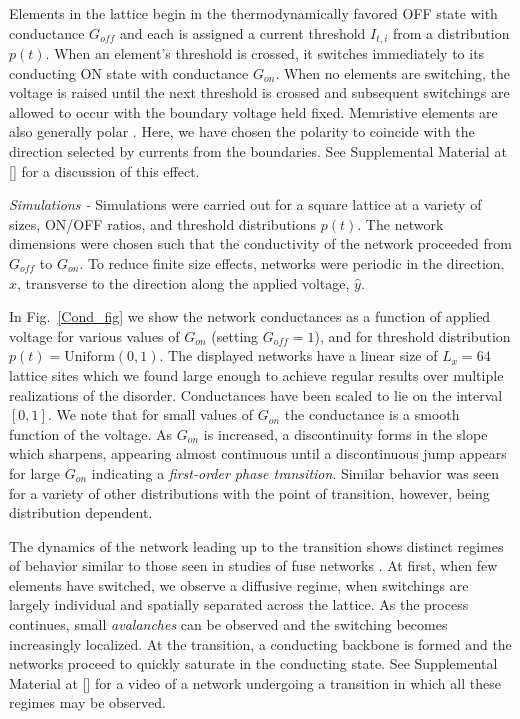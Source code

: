 \documentclass[aps,prl,reprint,groupedaddress]{revtex4-1}
\begin{document}

Elements in the lattice begin in the thermodynamically favored OFF state with conductance
$G_{off}$ and each is assigned a current threshold $I_{t,i}$ from a distribution
$p(t)$.  When an element's threshold is crossed, it switches immediately to
its conducting ON state with conductance $G_{on}$. When no elements are
switching, the voltage is raised until the next threshold is crossed and
subsequent switchings are allowed to occur with the
boundary voltage held fixed.  Memristive elements are also generally polar \cite{Hasegawa2012}. Here, 
we have chosen the polarity to coincide with the direction selected by
currents from the boundaries.  
See Supplemental Material at [] for a discussion of this effect.

{\it Simulations - } Simulations were carried out for a square lattice at a
variety of sizes,
ON/OFF ratios, and threshold distributions $p(t)$.  The network dimensions
were chosen such that the conductivity of the network proceeded from $G_{off}$
to $G_{on}$.  To reduce finite size effects, networks were periodic in the 
direction, $\hat{x}$, transverse to the direction along the applied voltage, $\hat{y}$. 

In Fig.~\ref{Cond_fig} we show the network conductances as a function of
applied voltage for various values of $G_{on}$ (setting $G_{off} = 1$), and for
threshold distribution $p(t) = \textrm{Uniform}(0,1)$.  The displayed networks have
a linear size of $L_x=64$ lattice sites which we found large enough to achieve
regular results over multiple realizations of the disorder. Conductances
have been scaled to lie on the interval $[0,1]$. We note that for small values
of $G_{on}$ the conductance is a smooth function of the voltage.  As $G_{on}$
is increased, a discontinuity forms in the slope which sharpens, appearing
almost continuous until a discontinuous jump appears for large $G_{on}$
indicating a {\it first-order phase transition}.  Similar behavior was seen for
a variety of other distributions with the point of transition, however, being
distribution dependent.

The dynamics of the network leading up to the transition shows 
distinct regimes of behavior similar to those seen in studies of fuse
networks \cite{Toussaint2006}. At first, when few elements have switched,
we observe a diffusive regime, when switchings are largely individual and
spatially separated across the lattice.  As the process continues,
small \textit{avalanches} can be observed and the switching becomes increasingly
localized.  At the transition, a conducting backbone is formed and the
networks proceed to quickly saturate in the conducting state. See
Supplemental Material at [] for a video of a network undergoing a transition
in which all these regimes may be observed. 
\end{document}
